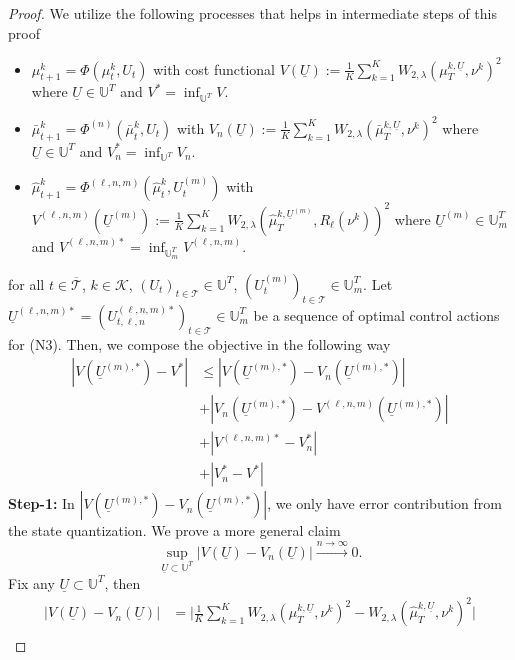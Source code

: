 \documentclass[11pt]{article}
\newcommand{\UU}{\mathbb{U}}
\newcommand{\cK}{\mathcal{K}}
\newcommand{\cT}{\mathcal{T}}
\begin{document}
\begin{proof}
    We utilize the following processes that helps in intermediate steps of this proof
    \begin{itemize}
        \item[(N1)] $\mu_{t+1}^k = \Phi(\mu_t^k, U_t)$ with cost functional $V(\underline{U}) := \frac{1}{K}\sum_{k=1}^K W_{2,\lambda}(\mu_T^{k,\underline{U}}, \nu^k)^2$ where $\underline{U}\in\UU^T$ and $V^* = \inf_{\UU^T}V$.
        \item[(N2)] $\bar{\mu}_{t+1}^k = \Phi^{(n)}(\bar{\mu}_{t}^k, U_t)$ with $V_n(\underline{U}) := \frac{1}{K}\sum_{k=1}^K W_{2,\lambda}(\bar{\mu}_{T}^{k,\underline{U}}, \nu^k)^2$ where $\underline{U}\in\UU^T$ and $V_n^* = \inf_{\UU^T}V_n$.
        \item[(N3)] $\hat{\mu}_{t+1}^k = \Phi^{(\ell,n,m)}(\hat{\mu}_{t}^k, U_t^{(m)})$ with $V^{(\ell,n,m)}(\underline{U}^{(m)}) := \frac{1}{K}\sum_{k=1}^K W_{2,\lambda}(\hat{\mu}_{T}^{k,\underline{U}^{(m)}}, R_\ell(\nu^k))^2$ where $\underline{U}^{(m)}\in\UU_m^T$ and $V^{(\ell,n,m)*} = \inf_{\UU_m^T}V^{(\ell,n,m)}$.
    \end{itemize}
    for all $t\in\overline{\cT}$, $k\in\cK$, $(U_t)_{t\in\cT}\in\UU^T$, $(U_t^{(m)})_{t\in\cT}\in\UU_m^T$. Let $\underline{U}^{(\ell,n,m)*} = (U_{t,\ell,n}^{(\ell,n,m)*})_{t\in\cT} \in \UU_m^T$ be a sequence of optimal control actions for (N3). Then, we compose the objective in the following way
    \begin{align*}
        |V(\underline{U}^{(m),*}) - V^*| &\leq |V(\underline{U}^{(m),*}) - V_{n}(\underline{U}^{(m),*})| \\
        &+|V_n(\underline{U}^{(m),*}) - V^{(\ell,n,m)}(\underline{U}^{(m),*})| \\
        &+|V^{(\ell,n,m)*} - V_n^*|\\
        &+|V_n^* - V^*|
    \end{align*}
    \noindent\textbf{Step-1:} In $|V(\underline{U}^{(m),*}) - V_{n}(\underline{U}^{(m),*})|$, we only have error contribution from the state quantization. We prove a more general claim
    \begin{equation*}
        \sup_{\underline{U}\subset\UU^T}|V(\underline{U}) - V_n(\underline{U})| \xrightarrow{n\to\infty} 0.
    \end{equation*}
    Fix any $\underline{U}\subset\UU^T$, then 
    \begin{align*}
        |V(\underline{U}) - V_n(\underline{U})| &= \bigg|\frac{1}{K}\sum_{k=1}^K W_{2,\lambda}(\mu_T^{k,\underline{U}}, \nu^k)^2 - W_{2,\lambda}(\hat{\mu}_T^{k,\underline{U}}, \nu^k)^2\bigg|\\

\end{align*}
\end{proof}
\end{document}
